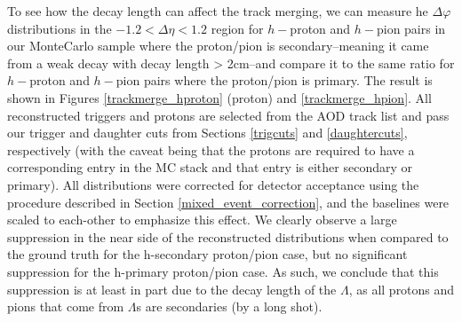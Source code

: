\documentclass[ALICE,manyauthors]{ALICE_analysis_notes}
\begin{document}
To see how the decay length can affect the track merging, we can measure he $\Delta\varphi$ distributions in the $-1.2 < \Delta\eta < 1.2$ region for $h-$proton and $h-$pion pairs in our MonteCarlo sample where the proton/pion is secondary--meaning it came from a weak decay with decay length > 2cm--and compare it to the same ratio for $h-$proton and $h-$pion pairs where the proton/pion is primary. The result is shown in Figures \ref{trackmerge_hproton} (proton) and \ref{trackmerge_hpion}. All reconstructed triggers and protons are selected from the AOD track list and pass our trigger and daughter cuts from Sections \ref{trigcuts} and \ref{daughtercuts}, respectively (with the caveat being that the protons are required to have a corresponding entry in the MC stack and that entry is either secondary or primary). All distributions were corrected for detector acceptance using the procedure described in Section \ref{mixed_event_correction}, and the baselines were scaled to each-other to emphasize this effect. We clearly observe a large suppression in the near side of the reconstructed distributions when compared to the ground truth for the h-secondary proton/pion case, but no significant suppression for the h-primary proton/pion case. As such, we conclude that this suppression is at least in part due to the decay length of the $\Lambda$, as all protons and pions that come from $\Lambda$s are secondaries (by a long shot).
\end{document}
